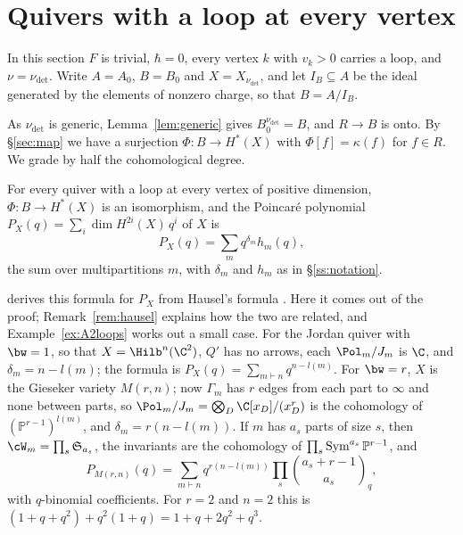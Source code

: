 \documentclass[11pt]{amsart}
\begin{document}
\section{Quivers with a loop at every vertex}\label{sec:loops}

In this section $F$ is trivial, $\hbar=0$, every vertex $k$ with $v_k>0$
carries a loop, and $\nu=\nu_{\det}$.  Write $A=A_0$, $B=B_0$ and
$X=X_{\nu_{\det}}$, and let $I_B\subseteq A$ be the ideal generated by the
elements of nonzero charge, so that $B=A/I_B$.

As $\nu_{\det}$ is generic, Lemma~\ref{lem:generic} gives
$B^{\nu_{\det}}_0=B$, and $R\to B$ is onto.  By \S\ref{sec:map} we have a
surjection $\Phi\colon B\to H^*(X)$ with $\Phi[f]=\kappa(f)$ for $f\in R$.  We
grade by half the cohomological degree.

\begin{theorem}\label{thm:loops}
For every quiver with a loop at every vertex of positive dimension,
$\Phi\colon B\to H^*(X)$ is an isomorphism, and the Poincar\'e polynomial
$P_X(q)=\sum_i\dim H^{2i}(X)\,q^i$ of $X$ is
\[
 P_X(q)=\sum_mq^{\delta_m}h_m(q),
\]
the sum over multipartitions $m$, with $\delta_m$ and $h_m$ as in
\S\ref{ss:notation}.
\end{theorem}

 derives this formula for $P_X$ from Hausel's
formula \cite{hauselBettiNumbers2006}.  Here it comes out of the proof;
Remark~\ref{rem:hausel} explains how the two are related, and
Example~\ref{ex:A2loops} works out a small case.  For the Jordan
quiver with $\bw=1$, so that $X=\Hilb^n(\C^2)$, $Q'$ has no arrows, each
$\Pol_m/J_m$ is $\C$, and $\delta_m=n-l(m)$; the formula is
$P_X(q)=\sum_{m\vdash n}q^{n-l(m)}$.  For $\bw=r$, $X$ is the Gieseker variety
$M(r,n)$; now $\Gamma_m$ has $r$ edges from each part to $\infty$ and none
between parts, so $\Pol_m/J_m=\bigotimes_D\C[x_D]/(x_D^r)$ is the cohomology of
$(\mathbb P^{r-1})^{l(m)}$, and $\delta_m=r(n-l(m))$.  If $m$ has $a_s$ parts of
size $s$, then $\cW_m=\prod_s\mathfrak S_{a_s}$, the invariants are the
cohomology of $\prod_s\operatorname{Sym}^{a_s}\mathbb P^{r-1}$, and
\[
 P_{M(r,n)}(q)=\sum_{m\vdash n}q^{r(n-l(m))}\prod_s\binom{a_s+r-1}{a_s}_{\!q},
\]
with $q$-binomial coefficients.  For $r=2$ and $n=2$ this is
$(1+q+q^2)+q^2(1+q)=1+q+2q^2+q^3$.
\end{document}
